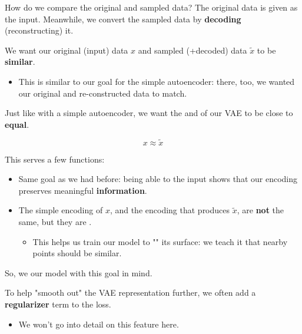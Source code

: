             How do we compare the original and sampled data? The original data is given as the input. Meanwhile, we convert the sampled data by \textbf{decoding} (reconstructing) it.

            We want our original (input) data $x$ and sampled (+decoded) data $\tilde{x}$ to be \textbf{similar}. 
            
            \begin{itemize}
                \item This is similar to our goal for the simple autoencoder: there, too, we wanted our original and re-constructed data to match.\\
            \end{itemize}

            \begin{concept}
                Just like with a simple autoencoder, we want the  and  of our VAE to be close to \textbf{equal}.

                \begin{equation*}
                    x \approx \tilde{x}
                \end{equation*}

                This serves a few functions:

                \begin{itemize}
                    \item Same goal as we had before: being able to  the input shows that our encoding preserves meaningful \textbf{information}.

                    \item The simple encoding of $x$, and the encoding that produces $\tilde{x}$, are \textbf{not} the same, but they are .
                        \begin{itemize}
                            \item This helps us train our model to "" its surface: we teach it that nearby points should be similar.
                        \end{itemize}
                \end{itemize}

                So, we  our model with this goal in mind.

                \subsecdiv

                To help "smooth out" the VAE representation further, we often add a \textbf{regularizer} term to the loss.

                \begin{itemize}
                    \item We won't go into detail on this feature here.
                \end{itemize}
            \end{concept}
            

